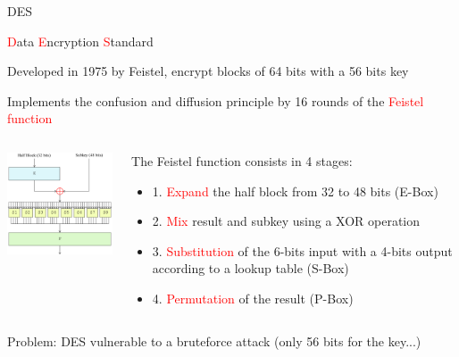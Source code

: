 \begin{frame}{DES}

\textcolor{red}{D}ata \textcolor{red}{E}ncryption \textcolor{red}{S}tandard

Developed in 1975 by Feistel, encrypt blocks of 64 bits with a 56 bits key

Implements the confusion and diffusion principle by 16 rounds of the \textcolor{red}{Feistel function}

\medskip

  \begin{columns}
  \begin{column}{0.5\textwidth}
  
    \centerline{\includegraphics[width=5cm]{img/DES.png}}

  \end{column}
  \begin{column}{0.5\textwidth}
  
  The Feistel function consists in 4 stages:
  
  \begin{itemize}
    \item 1. \textcolor{red}{Expand} the half block from 32 to 48 bits (E-Box)
    \item 2. \textcolor{red}{Mix} result and subkey using a XOR operation
    \item 3. \textcolor{red}{Substitution} of the 6-bits input with a 4-bits output according to a lookup table (S-Box)
    \item 4. \textcolor{red}{Permutation} of the result (P-Box)
  \end{itemize}
    
  \end{column}
  \end{columns}

  \medskip

  Problem: DES vulnerable to a bruteforce attack (only 56 bits for the key...)
  
\end{frame}

